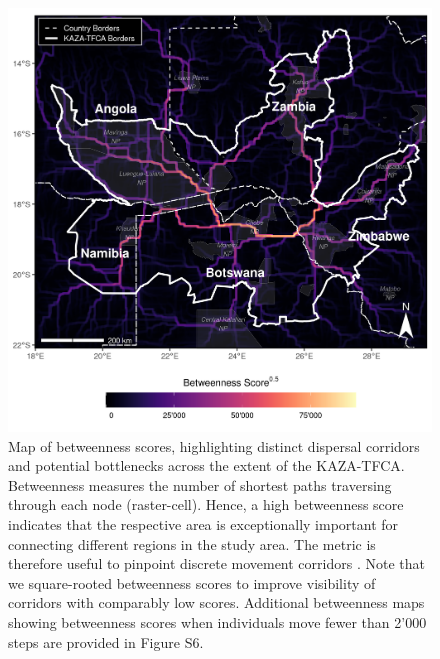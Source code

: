 \documentclass[abstract=on,10pt,a4paper,bibliography=totocnumbered]{article}
\begin{document}
\begin{figure}
  \includegraphics[width=\textwidth]{99_Betweenness.png}
  \caption{Map of betweenness scores, highlighting distinct dispersal corridors
  and potential bottlenecks across the extent of the KAZA-TFCA. Betweenness
  measures the number of shortest paths traversing through each node
  (raster-cell). Hence, a high betweenness score indicates that the respective
  area is exceptionally important for connecting different regions in the study
  area. The metric is therefore useful to pinpoint discrete movement corridors
  \citep{BastilleRousseau.2018}. Note that we square-rooted betweenness scores
  to improve visibility of corridors with comparably low scores. Additional
  betweenness maps showing betweenness scores when individuals move fewer than
  2'000 steps are provided in Figure S6.}
  \label{Betweenness}
\end{figure}
\end{document}
